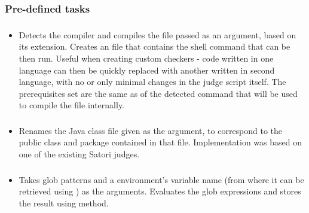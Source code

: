 \subsubsection{Pre-defined tasks}\label{subsec:predefined_tasks}

\subsubsection*{}\label{subsec:AutoCompile}

\begin{itemize}[label={}]
    \item Detects the compiler and compiles the file passed as an argument, based on its extension.
          Creates an  file that contains the shell command that can be then run.
          Useful when creating custom checkers - code written in one language can then be quickly replaced with another
          written in second language, with no or only minimal changes in the judge script itself.
          The prerequisites set are the same as of the detected command that will be used to compile the file
          internally.
\end{itemize}

\subsubsection*{}\label{subsec:RenameJavaFile}

\begin{itemize}[label={}]
    \item Renames the Java class file given as the argument, to correspond to the public class and package contained in
          that file.
          Implementation was based on one of the existing Satori judges.
\end{itemize}

\subsubsection*{}\label{subsec:ListFiles}

\begin{itemize}[label={}]
    \item Takes glob patterns and a environment's variable name (from where it can be retrieved using
          \hyperref[sec:DependentExpr]{}) as the arguments.
          Evaluates the glob expressions and stores the result using
          \hyperref[sec:set_variable]{} method.
\end{itemize}

